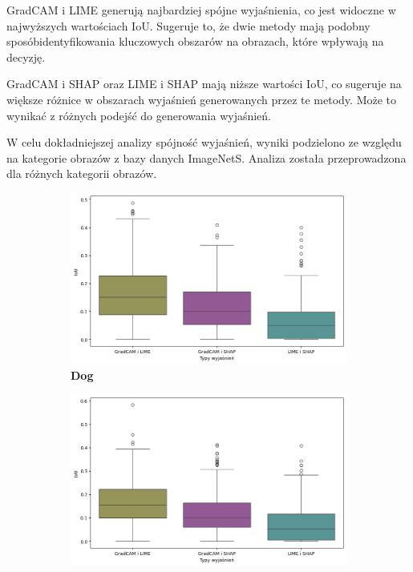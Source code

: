 GradCAM i LIME generują najbardziej spójne wyjaśnienia, co jest widoczne w najwyższych wartościach IoU.
Sugeruje to, że dwie metody mają podobny sposóbidentyfikowania kluczowych obszarów na obrazach, które wpływają na decyzję.

GradCAM i SHAP oraz LIME i SHAP mają niższe wartości IoU, co sugeruje na większe różnice w obszarach wyjaśnień generowanych przez te metody.
Może to wynikać z różnych podejść do generowania wyjaśnień.


\vspace{1cm}

W celu dokładniejszej analizy spójność wyjaśnień, wyniki podzielono ze względu na kategorie obrazów z bazy danych ImageNetS.
Analiza została przeprowadzona dla różnych kategorii obrazów.

\begin{figure}[h]
	\centering
	\begin{subfigure}[b]{0.3\textwidth}
		\includegraphics[width=.9\textwidth]{img/base_coherence_dog}
		\caption{\textbf{Dog}}  \label{}
	\end{subfigure}
	\begin{subfigure}[b]{0.3\textwidth}
		\centering\includegraphics[width=.9\textwidth]{img/base_coherence_bird}

\end{subfigure}
\end{figure}
